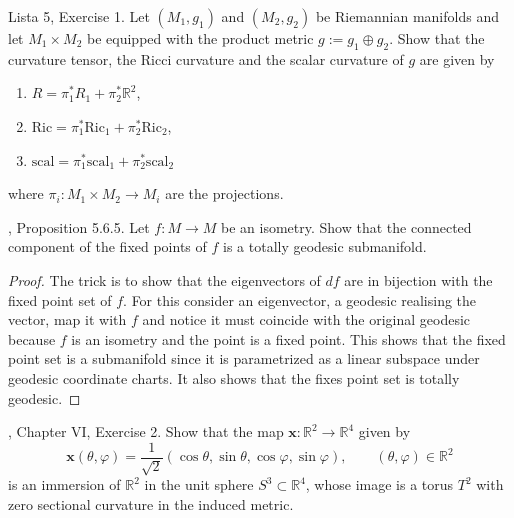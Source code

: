 \begin{exercise}
\label{exercise-curvatures-in-product}
Lista 5, Exercise 1. Let $(M_1,g_1)$ and $(M_2,g_2)$ be Riemannian manifolds and
let $M_1\times M_2$ be equipped with the product metric $g:=g_1\oplus g_2$. Show
that the curvature tensor, the Ricci curvature and the scalar curvature of $g$
are given by
\begin{enumerate}
\item $R=\pi_1^*R_1+\pi_2^*\mathbb{R}^2$,
\item $\text{Ric}=\pi_1^*\text{Ric}_1+\pi_2^*\text{Ric}_2$,
\item $\text{scal}=\pi_1^*\text{scal}_1+\pi_2^*\text{scal}_2$
\end{enumerate}
where $\pi_i:M_1\times M_2\to M_i$ are the projections.
\end{exercise}

\begin{exercise}
\label{exercise-fixed-point-set-of-isometry-is-totally-geodesic-submanifold}
\cite{pet}, Proposition 5.6.5. Let $f:M\to M$ be an isometry. Show that the
connected component of the fixed points of $f$ is a totally geodesic
submanifold.
\end{exercise}

\begin{proof}
The trick is to show that the eigenvectors of $df$ are in bijection with the
fixed point set of $f$. For this consider an eigenvector, a geodesic realising 
the vector, map it with $f$ and notice it must coincide with the original 
geodesic because $f$ is an isometry and the point is a fixed point. This shows
that the fixed point set is a submanifold since it is parametrized as a linear
subspace under geodesic coordinate charts. It also shows that the fixes point
set is totally geodesic.
\end{proof}

\begin{exercise}
\label{exercise-Clifford-torus-preparation}
\cite{doc}, Chapter VI, Exercise 2. Show that the map
$\mathbf{x}:\mathbb{R}^2\to\mathbb{R}^4$ given by
$$
\mathbf{x}(\theta,\varphi)
=\frac{1}{\sqrt{2}}(\cos\theta,\sin\theta,\cos\varphi,\sin\varphi),
\qquad(\theta,\varphi)\in\mathbb{R}^2
$$
is an immersion of $\mathbb{R}^2$ in the unit sphere $S^3\subset\mathbb{R}^4$,
whose image is a torus $T^2$ with zero sectional curvature in the induced
metric.
\end{exercise}

